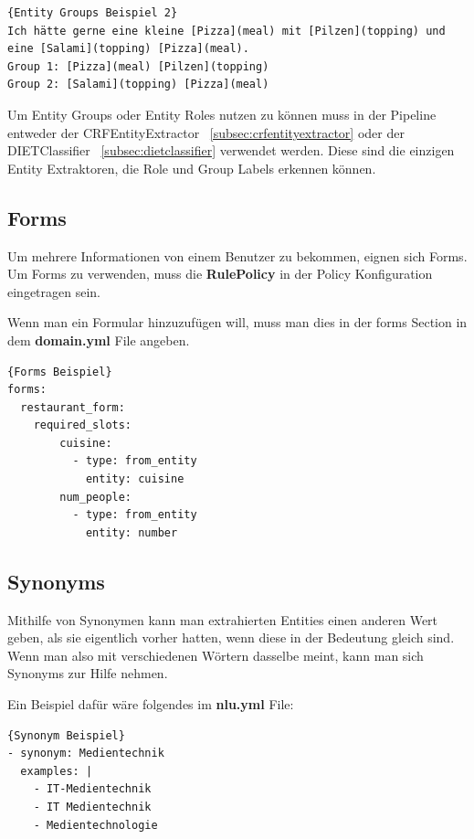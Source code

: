 \begin{lstlisting}[label={lst:entity-groups-example-2},caption={Entity Groups Beispiel 2}]{Entity Groups Beispiel 2}
Ich hätte gerne eine kleine [Pizza](meal) mit [Pilzen](topping) und eine [Salami](topping) [Pizza](meal).
Group 1: [Pizza](meal) [Pilzen](topping)
Group 2: [Salami](topping) [Pizza](meal)
\end{lstlisting}

Um Entity Groups oder Entity Roles nutzen zu können muss in der Pipeline entweder der CRFEntityExtractor ~\ref{subsec:crfentityextractor} oder der DIETClassifier ~\ref{subsec:dietclassifier} verwendet werden.
Diese sind die einzigen Entity Extraktoren, die Role und Group Labels erkennen können.\cite{entityRolesGroups}

\subsection{Forms}

Um mehrere Informationen von einem Benutzer zu bekommen, eignen sich Forms.
Um Forms zu verwenden, muss die \textbf{RulePolicy} in der Policy Konfiguration eingetragen sein.\cite{forms}

Wenn man ein Formular hinzuzufügen will, muss man dies in der forms Section in dem \textbf{domain.yml} File angeben.

\begin{lstlisting}[label={lst:forms-example},caption={Forms Beispiel}]{Forms Beispiel}
forms:
  restaurant_form:
    required_slots:
        cuisine:
          - type: from_entity
            entity: cuisine
        num_people:
          - type: from_entity
            entity: number
\end{lstlisting}

\subsection{Synonyms}

Mithilfe von Synonymen kann man extrahierten Entities einen anderen Wert geben, als sie eigentlich vorher hatten, wenn diese in der Bedeutung gleich sind.
Wenn man also mit verschiedenen Wörtern dasselbe meint, kann man sich Synonyms zur Hilfe nehmen.\cite{synonyms}

Ein Beispiel dafür wäre folgendes im \textbf{nlu.yml} File:

\begin{lstlisting}[label={lst:synonym-example},caption={Synonym Beispiel}]{Synonym Beispiel}
- synonym: Medientechnik
  examples: |
    - IT-Medientechnik
    - IT Medientechnik
    - Medientechnologie
\end{lstlisting}

